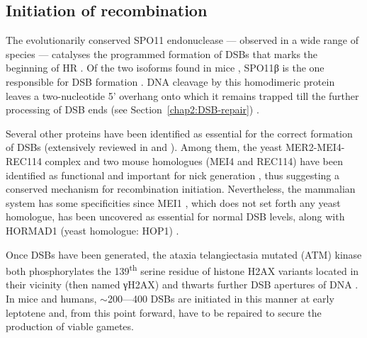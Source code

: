 \subsection{Initiation of recombination}

The evolutionarily conserved SPO11 endonuclease — observed in a wide range of species \citep{baudat2000chromosome,mckim1998meiw68,romanienko2000mouse,steiner2002meiotic,bowring2006chromosome,stacey2006arabidopsis} — catalyses the programmed formation of DSBs \citep{keeney1997meiosisspecific,bergerat1997atypical} that marks the beginning of HR \citep{sun1989double}.
Of the two isoforms found in mice \citep{metzler-guillemain2000identification}, SPO11\textgreek{β} is the one responsible for DSB formation \citep{bellani2010expression}.
DNA cleavage by this homodimeric protein leaves a two-nucleotide 5' overhang \citep{demassy1995nucleotidea}	onto which it remains trapped till the further processing of DSB ends (see Section~\ref{chap2:DSB-repair}) \citep[reviewed in][]{cole2010evolutionarya}.

Several other proteins have been identified as essential for the correct formation of DSBs (extensively reviewed in \citealp{keeney2008spo11a} and \citealp{demassy2013initiation}).
Among them, the yeast MER2-MEI4-REC114 complex \citep{li2006saccharomyces,maleki2007interactions} and two mouse homologues (MEI4 and REC114) have been identified as functional and important for nick generation \citep{kumar2010functional,kumar2015mei4}, thus suggesting a conserved mechanism for recombination initiation. 
Nevertheless, the mammalian system has some specificities since MEI1 \citep{libby2002mouse,libby2003positional}, which does not set forth any yeast homologue, has been uncovered as essential for normal DSB levels, along with HORMAD1 (yeast homologue: HOP1) \citep{shin2010hormad1,daniel2011meiotic}.

Once DSBs have been generated, the ataxia telangiectasia mutated (ATM) kinase both phosphorylates the 139\textsuperscript{th} serine residue of histone H2AX variants located in their vicinity (then named \textgreek{γ}H2AX) \citep{rogakou1998dna,burma2001atm} and thwarts further DSB apertures of DNA \citep{lange2011atm,lukaszewicz2018control}.\\

In mice and humans, ${\sim}$200—400 DSBs are initiated in this manner at early leptotene and, from this point forward, have to be repaired to secure the production of viable gametes.







